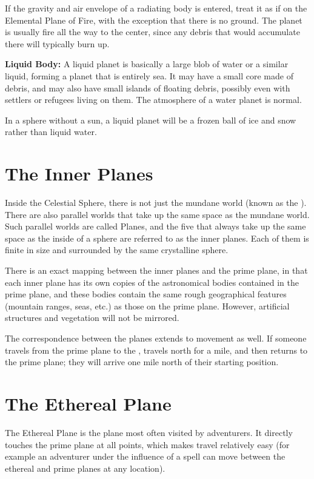 \begin{multicols*}{2}
If the gravity and air envelope of a radiating body is entered, treat it as if on the Elemental Plane of Fire, with the exception that there is no ground. The planet is usually fire all the way to the center, since any debris that would accumulate there will typically burn up.

\textbf{Liquid Body:} A liquid planet is basically a large blob of water or a similar liquid, forming a planet that is entirely sea. It may have a small core made of debris, and may also have small islands of floating debris, possibly even with settlers or refugees living on them. The atmosphere of a water planet is normal.

In a sphere without a sun, a liquid planet will be a frozen ball of ice and snow rather than liquid water.

\section{The Inner Planes}\label{sec:The Inner Planes}
Inside the Celestial Sphere, there is not just the mundane world (known as the ). There are also parallel worlds that take up the same space as the mundane world. Such parallel worlds are called Planes, and the five that always take up the same space as the inside of a sphere are referred to as the inner planes. Each of them is finite in size and surrounded by the same crystalline sphere.

There is an exact mapping between the inner planes and the prime plane, in that each inner plane has its own copies of the astronomical bodies contained in the prime plane, and these bodies contain the same rough geographical features (mountain ranges, seas, etc.) as those on the prime plane. However, artificial structures and vegetation will not be mirrored.

The correspondence between the planes extends to movement as well. If someone travels from the prime plane to the , travels north for a mile, and then returns to the prime plane; they will arrive one mile north of their starting position.

\section{The Ethereal Plane}\label{sec:Ethereal Plane}
The Ethereal Plane is the plane most often visited by adventurers. It directly touches the prime plane at all points, which makes travel relatively easy (for example an adventurer under the influence of a  spell can move between the ethereal and prime planes at any location).


\end{multicols*}
